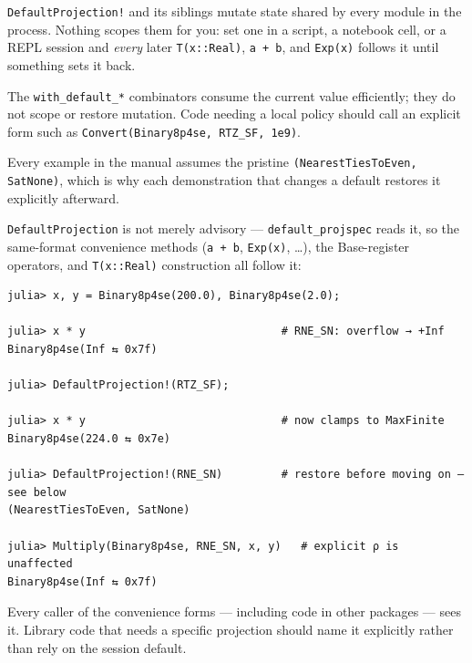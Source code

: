 \begin{tcolorbox}[toptitle=-1mm,bottomtitle=1mm,colback=admonition-warning!50!white,colframe=admonition-warning,title=\textbf{The session defaults are process-global and they stay set}]
\texttt{DefaultProjection!} and its siblings mutate state shared by every module in the process. Nothing scopes them for you: set one in a script, a notebook cell, or a REPL session and \emph{every} later \texttt{T(x::Real)}, \texttt{a + b}, and \texttt{Exp(x)} follows it until something sets it back.

The \texttt{with\_\allowbreak{}default\_\allowbreak{}*} combinators consume the current value efficiently; they do not scope or restore mutation. Code needing a local policy should call an explicit form such as \texttt{Convert(\allowbreak{}Binary8p4se, RTZ\_\allowbreak{}SF, 1e9)}.

Every example in the manual assumes the pristine \texttt{(\allowbreak{}NearestTiesToEven, SatNone)}, which is why each demonstration that changes a default restores it explicitly afterward.

\end{tcolorbox}


\texttt{DefaultProjection} is not merely advisory — \texttt{default\_\allowbreak{}projspec} reads it, so the same-format convenience methods (\texttt{a + b}, \texttt{Exp(x)}, …), the Base-register operators, and \texttt{T(x::Real)} construction all follow it:




\nopagebreak[4]
\begin{verbatim}
julia> x, y = Binary8p4se(200.0), Binary8p4se(2.0);

julia> x * y                              # RNE_SN: overflow → +Inf
Binary8p4se(Inf ⇆ 0x7f)

julia> DefaultProjection!(RTZ_SF);

julia> x * y                              # now clamps to MaxFinite
Binary8p4se(224.0 ⇆ 0x7e)

julia> DefaultProjection!(RNE_SN)         # restore before moving on — see below
(NearestTiesToEven, SatNone)

julia> Multiply(Binary8p4se, RNE_SN, x, y)   # explicit ρ is unaffected
Binary8p4se(Inf ⇆ 0x7f)
\end{verbatim}



\begin{tcolorbox}[toptitle=-1mm,bottomtitle=1mm,colback=admonition-warning!50!white,colframe=admonition-warning,title=\textbf{Changing the default is a global semantic change}]
Every caller of the convenience forms — including code in other packages — sees it. Library code that needs a specific projection should name it explicitly rather than rely on the session default.

\end{tcolorbox}


